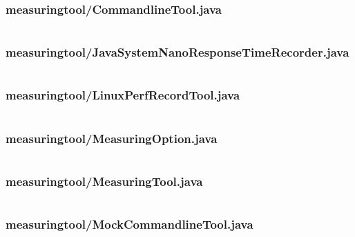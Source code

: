 \documentclass[a4paper,12pt]{article}
\begin{document}
\subsubsection{measuringtool/CommandlineTool.java}
\inputminted[fontsize=\small, linenos, numbersep=5pt, tabsize=4, frame=topline,framesep=0.8cm]{java}{/home/tituomin/StudioProjects/nativebenchmark/src/fi/helsinki/cs/tituomin/nativebenchmark/measuringtool/CommandlineTool.java}
\vspace{1cm}
\subsubsection{measuringtool/JavaSystemNanoResponseTimeRecorder.java}
\inputminted[fontsize=\small, linenos, numbersep=5pt, tabsize=4, frame=topline,framesep=0.8cm]{java}{/home/tituomin/StudioProjects/nativebenchmark/src/fi/helsinki/cs/tituomin/nativebenchmark/measuringtool/JavaSystemNanoResponseTimeRecorder.java}
\vspace{1cm}
\subsubsection{measuringtool/LinuxPerfRecordTool.java}
\inputminted[fontsize=\small, linenos, numbersep=5pt, tabsize=4, frame=topline,framesep=0.8cm]{java}{/home/tituomin/StudioProjects/nativebenchmark/src/fi/helsinki/cs/tituomin/nativebenchmark/measuringtool/LinuxPerfRecordTool.java}
\vspace{1cm}
\subsubsection{measuringtool/MeasuringOption.java}
\inputminted[fontsize=\small, linenos, numbersep=5pt, tabsize=4, frame=topline,framesep=0.8cm]{java}{/home/tituomin/StudioProjects/nativebenchmark/src/fi/helsinki/cs/tituomin/nativebenchmark/measuringtool/MeasuringOption.java}
\vspace{1cm}
\subsubsection{measuringtool/MeasuringTool.java}
\inputminted[fontsize=\small, linenos, numbersep=5pt, tabsize=4, frame=topline,framesep=0.8cm]{java}{/home/tituomin/StudioProjects/nativebenchmark/src/fi/helsinki/cs/tituomin/nativebenchmark/measuringtool/MeasuringTool.java}
\vspace{1cm}
\subsubsection{measuringtool/MockCommandlineTool.java}
\inputminted[fontsize=\small, linenos, numbersep=5pt, tabsize=4, frame=topline,framesep=0.8cm]{java}{/home/tituomin/StudioProjects/nativebenchmark/src/fi/helsinki/cs/tituomin/nativebenchmark/measuringtool/MockCommandlineTool.java}
\vspace{1cm}
\end{document}
